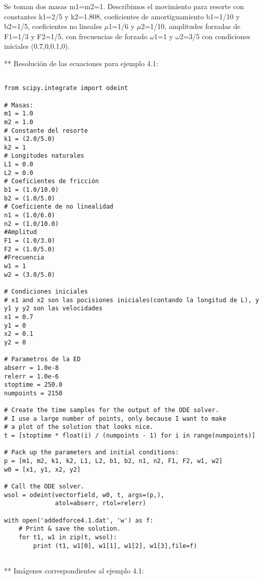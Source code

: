 \documentclass{article} %
\begin{document}
Se toman dos masas m1=m2=1. Describimos el movimiento para resorte con constantes k1=2/5 y k2=1.808, coeficientes de amortiguamiento b1=1/10 y b2=1/5, coeficientes no lineales $\mu$1=1/6 y $\mu$2=1/10, amplitudes forzadas de F1=1/3 y F2=1/5, con frecuencias de forzado $\omega$1=1 y $\omega$2=3/5 con condiciones iniciales (0.7,0,0.1,0).

\vspace{0.5 cm}

** Resolución de las ecuaciones para ejemplo 4.1:


\begin{verbatim} 

from scipy.integrate import odeint

# Masas:
m1 = 1.0
m2 = 1.0
# Constante del resorte
k1 = (2.0/5.0)
k2 = 1
# Longitudes naturales
L1 = 0.0
L2 = 0.0
# Coeficientes de fricción
b1 = (1.0/10.0)
b2 = (1.0/5.0)
# Coeficiente de no linealidad
n1 = (1.0/6.0)
n2 = (1.0/10.0)
#Amplitud
F1 = (1.0/3.0)
F2 = (1.0/5.0)
#Frecuencia
w1 = 1
w2 = (3.0/5.0)

# Condiciones iniciales
# x1 and x2 son las pocisiones iniciales(contando la longitud de L), y y1 y y2 son las velocidades
x1 = 0.7
y1 = 0
x2 = 0.1
y2 = 0

# Parametros de la ED
abserr = 1.0e-8
relerr = 1.0e-6
stoptime = 250.0
numpoints = 2150

# Create the time samples for the output of the ODE solver.
# I use a large number of points, only because I want to make
# a plot of the solution that looks nice.
t = [stoptime * float(i) / (numpoints - 1) for i in range(numpoints)]

# Pack up the parameters and initial conditions:
p = [m1, m2, k1, k2, L1, L2, b1, b2, n1, n2, F1, F2, w1, w2]
w0 = [x1, y1, x2, y2]

# Call the ODE solver.
wsol = odeint(vectorfield, w0, t, args=(p,),
              atol=abserr, rtol=relerr)

with open('addedforce4.1.dat', 'w') as f:
    # Print & save the solution.
    for t1, w1 in zip(t, wsol):
        print (t1, w1[0], w1[1], w1[2], w1[3],file=f)


\end{verbatim}


** Imágenes correspondientes al ejemplo 4.1:
\end{document}
